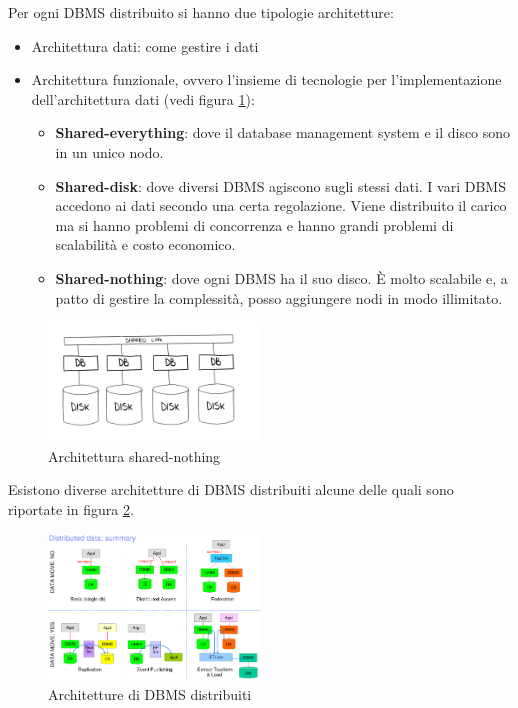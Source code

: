 Per ogni DBMS distribuito si hanno due tipologie architetture:
\begin{itemize}
      \item Architettura dati: come gestire i dati
      \item Architettura funzionale, ovvero l'insieme di tecnologie per l'implementazione
            dell'architettura dati (vedi figura \ref{fig:sharedNothing}):
            \begin{itemize}
                  \item \textbf{Shared-everything}: dove il database management
                        system e il disco sono in un unico nodo.
                  \item \textbf{Shared-disk}: dove diversi DBMS agiscono sugli
                        stessi dati. I vari DBMS accedono ai dati secondo una
                        certa regolazione. Viene distribuito il carico ma si
                        hanno problemi di concorrenza e hanno grandi problemi di
                        scalabilità e costo economico.
                  \item \textbf{Shared-nothing}: dove ogni DBMS ha il suo disco.
                        È molto scalabile e, a patto di gestire la complessità,
                        posso aggiungere nodi in modo illimitato.
            \end{itemize}
\end{itemize}
\begin{figure}[!ht]
      \centering
      \includegraphics[width=0.5\textwidth]{img/SharedNothing.jpg}
      \caption{Architettura shared-nothing}
      \label{fig:sharedNothing}
\end{figure}
Esistono diverse architetture di DBMS distribuiti alcune delle quali sono
riportate in figura \ref{fig:DBMS_distributed_architecture}.
\begin{figure}[!ht]
      \centering
      \includegraphics[width=0.5\textwidth]{./img/DBMS/DBMS_distributed_architecture.png}
      \caption{Architetture di DBMS distribuiti}
      \label{fig:DBMS_distributed_architecture}
\end{figure}


